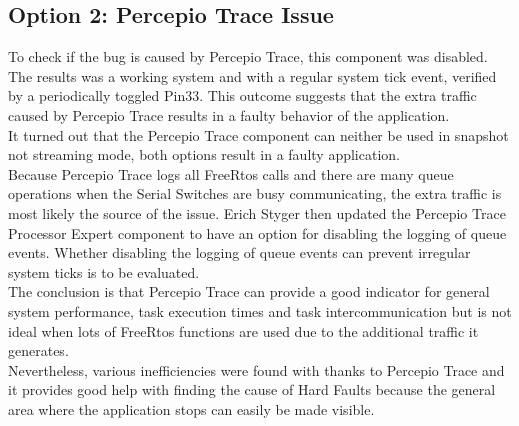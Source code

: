 \subsection{Option 2: Percepio Trace Issue}
%
%
To check if the bug is caused by Percepio Trace, this component was disabled. The results was a working system and with a regular system tick event, verified by a periodically toggled Pin33. This outcome suggests that the extra traffic caused by Percepio Trace results in a faulty behavior of the application.\\
It turned out that the Percepio Trace component can neither be used in snapshot not streaming mode, both options result in a faulty application.\\
Because Percepio Trace logs all FreeRtos calls and there are many queue operations when the Serial Switches are busy communicating, the extra traffic is most likely the source of the issue. Erich Styger then updated the Percepio Trace Processor Expert component to have an option for disabling the logging of queue events. 
Whether disabling the logging of queue events can prevent irregular system ticks is to be evaluated.\\
The conclusion is that Percepio Trace can provide a good indicator for general system performance, task execution times and task intercommunication but is not ideal when lots of FreeRtos functions are used due to the additional traffic it generates.\\
Nevertheless, various inefficiencies were found with thanks to Percepio Trace and it provides good help with finding the cause of Hard Faults because the general area where the application stops can easily be made visible.
%
%
%
